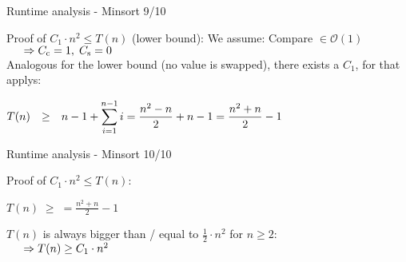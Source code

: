 
\begin{frame}{Runtime analysis - Minsort 9/10}
  \begin{block}{Proof of $C_1 \cdot n^2 \leq T(n)$
      ({\color{Mittel-Gruen}lower bound}):}
    We assume: Compare $\in \mathcal{O}(1)$\\
    $\hspace{1.5em}\Rightarrow C_\text{c} = 1, \; C_\text{s} = 0$\\
    \vspace*{0.5em}
    Analogous for the {\color{Mittel-Gruen}lower bound}
    (no value is swapped), there exists a $C_1$, for that
    applys:\\[0.5em]
    \begin{centering}
      \begin{math}
        \begin{array}{@{}rcl@{}}
          T(n) & \geq &
          \displaystyle
          n - 1 + \sum^{n - 1}_{i=1} i
          = \frac{n^2 - n}{2} + n - 1
          = \frac{n^2 + n}{2} - 1
        \end{array}
      \end{math}
    \end{centering}
  \end{block}
\end{frame}


\begin{frame}{Runtime analysis - Minsort 10/10}
  \begin{block}{Proof of $C_1 \cdot n^2 \leq T(n)$:}
    \vspace*{0.5em}
    \begin{center}
      $\displaystyle
        T(n) \; \geq \;
          = \frac{n^2 + n}{2} - 1
      $\\
    \end{center}
    $T(n)$ is always bigger than / equal to $\frac{1}{2} \cdot n^2$
    for $n \geq 2$:\\[1.0em]
    $\hspace*{1.5em}\Rightarrow T(n) \geq C_1 \cdot n^2$
  \end{block}
\end{frame}